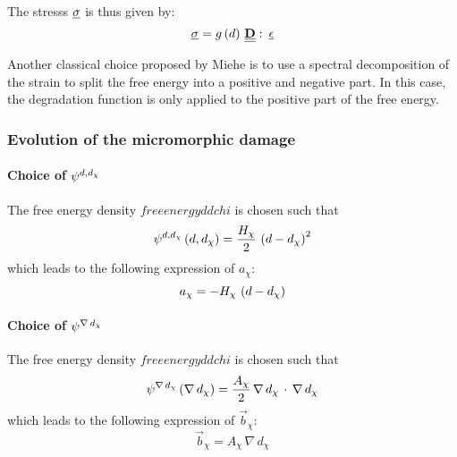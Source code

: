 The stresss \(\underline{\sigma}\) is thus given by:
\begin{equation}
  \underline{\sigma} = g\left(d\right)\,\underline{\underline{\mathbf{D}}}\,\colon\,\underline{\epsilon}
\end{equation}

Another classical choice proposed by Miehe \cite{miehe_phase_2010} is to
use a spectral decomposition of the strain to split the free energy into
a positive and negative part. In this case, the degradation function is only applied
to the positive part of the free energy.

\subsubsection{Evolution of the micromorphic damage}

\paragraph{Choice of \({\psi}^{d, d_{\chi}}\)}

The free energy density $freeenergyddchi$ is chosen such that
%
%
%
\begin{equation}
  {\psi}^{d, d_{\chi}}\left(d, d_{\chi}\right)=\displaystyle \frac{\displaystyle H_{\chi}}{\displaystyle 2}\,\left(d-d_{\chi}\right)^{2}
\end{equation}
%
%
%
which leads to the following expression of \(a_{\chi}\):
\begin{equation}
  \label{eq:micromorphicdamage:achi}
  a_{\chi} = - H_{\chi}\,\left(d-d_{\chi}\right)
\end{equation}

\paragraph{Choice of \({\psi}^{\nabla\,d_{\chi}}\)}

The free energy density $freeenergyddchi$ is chosen such that
%
%
%
\begin{equation}
  \label{eq:micromorphicdamage:freeenergygdchi}
  {\psi}^{\nabla\,d_{\chi}}\left(\nabla\, d_{\chi}\right) = \displaystyle \frac{\displaystyle A_{\chi}}{\displaystyle 2}\,\nabla\, d_{\chi}\,\cdot\,\nabla\, d_{\chi}
\end{equation}
%
%
%
which leads to the following expression of \(\vec{b}_{\chi}\):
%
%
%
\begin{equation}
  \label{eq:micromorphicdamage:bchi}
  \vec{b}_{\chi} = A_{\chi}\,\nabla\, d_{\chi}
\end{equation}

